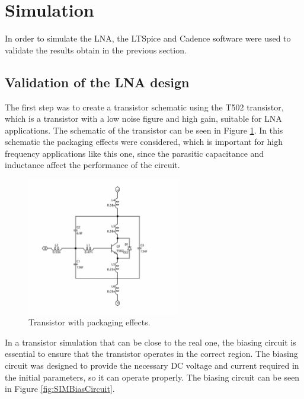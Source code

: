 \section{Simulation}

In order to simulate the LNA, the LTSpice and Cadence software were used to validate the results obtain in the previous section. 

\subsection{Validation of the LNA design}

The first step was to create a transistor schematic using the T502 transistor, which is a transistor with a low noise figure and high gain, suitable for LNA applications. The schematic of the transistor can be seen in Figure \ref{fig:TransistorReal}. In this schematic the packaging effects were considered, which is important for high frequency applications like this one, since the parasitic capacitance and inductance affect the performance of the circuit.

\begin{figure}[H]
    \centering
    \includegraphics[width=0.6\textwidth]{Images/TransistorReal.png}
    \caption{Transistor with packaging effects.}
    \label{fig:TransistorReal}
\end{figure}

In a transistor simulation that can be close to the real one, the biasing circuit is essential to ensure that the transistor operates in the correct region. The biasing circuit was designed to provide the necessary DC voltage and current required in the initial parameters, so it can operate properly. The biasing circuit can be seen in Figure \ref{fig:SIMBiasCircuit}.

